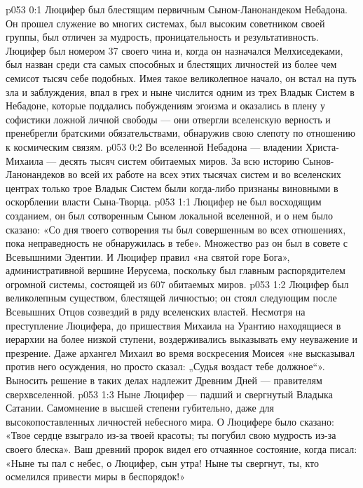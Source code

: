 \author{Мановандет Мелхиседек}
\vs p053 0:1 Люцифер был блестящим первичным Сыном\hyp{}Ланонандеком Небадона. Он прошел служение во многих системах, был высоким советником своей группы, был отличен за мудрость, проницательность и результативность. Люцифер был номером 37 своего чина и, когда он назначался Мелхиседеками, был назван среди ста самых способных и блестящих личностей из более чем семисот тысяч себе подобных. Имея такое великолепное начало, он встал на путь зла и заблуждения, впал в грех и ныне числится одним из трех Владык Систем в Небадоне, которые поддались побуждениям эгоизма и оказались в плену у софистики ложной личной свободы --- они отвергли вселенскую верность и пренебрегли братскими обязательствами, обнаружив свою слепоту по отношению к космическим связям.
\vs p053 0:2 Во вселенной Небадона --- владении Христа\hyp{}Михаила --- десять тысяч систем обитаемых миров. За всю историю Сынов\hyp{}Ланонандеков во всей их работе на всех этих тысячах систем и во вселенских центрах только трое Владык Систем были когда\hyp{}либо признаны виновными в оскорблении власти Сына\hyp{}Творца.
\vs p053 1:1 Люцифер не был восходящим созданием, он был сотворенным Сыном локальной вселенной, и о нем было сказано: «Со дня твоего сотворения ты был совершенным во всех отношениях, пока неправедность не обнаружилась в тебе». Множество раз он был в совете с Всевышними Эдентии. И Люцифер правил «на святой горе Бога», административной вершине Иерусема, поскольку был главным распорядителем огромной системы, состоящей из 607 обитаемых миров.
\vs p053 1:2 Люцифер был великолепным существом, блестящей личностью; он стоял следующим после Всевышних Отцов созвездий в ряду вселенских властей. Несмотря на преступление Люцифера, до пришествия Михаила на Урантию находящиеся в иерархии на более низкой ступени, воздерживались выказывать ему неуважение и презрение. Даже архангел Михаил во время воскресения Моисея «не высказывал против него осуждения, но просто сказал: „Судья воздаст тебе должное“». Выносить решение в таких делах надлежит Древним Дней --- правителям сверхвселенной.
\vs p053 1:3 Ныне Люцифер --- падший и свергнутый Владыка Сатании. Самомнение в высшей степени губительно, даже для высокопоставленных личностей небесного мира. О Люцифере было сказано: «Твое сердце взыграло из\hyp{}за твоей красоты; ты погубил свою мудрость из\hyp{}за своего блеска». Ваш древний пророк видел его отчаянное состояние, когда писал: «Ныне ты пал с небес, о Люцифер, сын утра! Ныне ты свергнут, ты, кто осмелился привести миры в беспорядок!»
